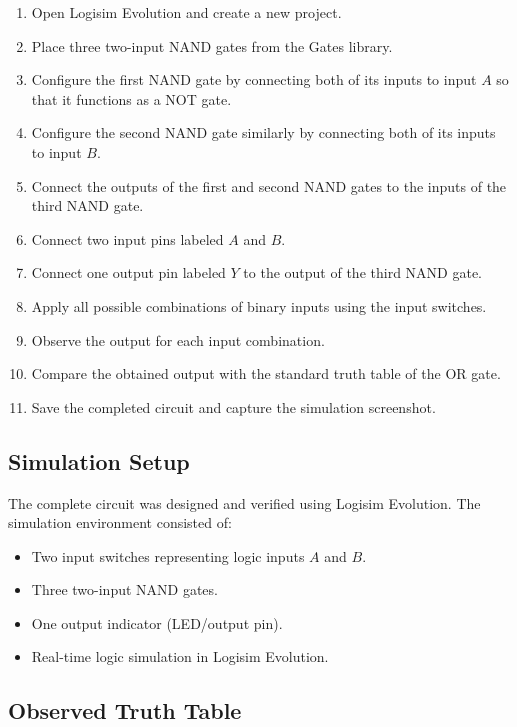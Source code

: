 \documentclass[12pt,a4paper]{article}
\begin{document}
\begin{enumerate}
    \item Open Logisim Evolution and create a new project.
    \item Place three two-input NAND gates from the Gates library.
    \item Configure the first NAND gate by connecting both of its inputs to input $A$ so that it functions as a NOT gate.
    \item Configure the second NAND gate similarly by connecting both of its inputs to input $B$.
    \item Connect the outputs of the first and second NAND gates to the inputs of the third NAND gate.
    \item Connect two input pins labeled $A$ and $B$.
    \item Connect one output pin labeled $Y$ to the output of the third NAND gate.
    \item Apply all possible combinations of binary inputs using the input switches.
    \item Observe the output for each input combination.
    \item Compare the obtained output with the standard truth table of the OR gate.
    \item Save the completed circuit and capture the simulation screenshot.
\end{enumerate}

\subsection{Simulation Setup}

The complete circuit was designed and verified using Logisim Evolution. The simulation environment consisted of:

\begin{itemize}
    \item Two input switches representing logic inputs $A$ and $B$.
    \item Three two-input NAND gates.
    \item One output indicator (LED/output pin).
    \item Real-time logic simulation in Logisim Evolution.
\end{itemize}


\subsection{Observed Truth Table}
\end{document}
